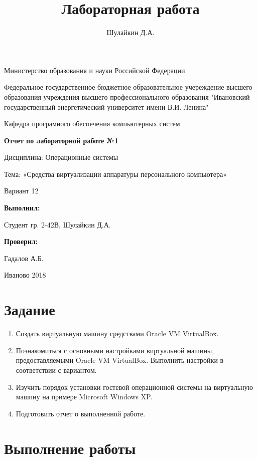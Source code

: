 \documentclass[a4paper]{article}
\title{Лабораторная работа}
\author{Шулайкин Д.А.}
\begin{document}
\onehalfspacing
\thispagestyle{empty}
\begin{center}
Министерство образования и науки Российской Федерации
\vspace{10pt}

Федеральное государственное бюджетное образовательное учереждение высшего образования учреждения высшего профессионального образования "Ивановский государственный энергетический университет имени В.И. Ленина"
\vspace{40pt}

Кафедра програмного обеспечения компьютерных систем
\vspace{40pt}

\textbf{Отчет по лабораторной работе №1}

Дисциплина: Операционные системы

Тема: «Средства виртуализации аппаратуры персонального компьютера»

Вариант 12
\end{center}

\vspace{330pt}
\begin{flushright}
\textbf{Выполнил:}

Студент гр. 2-42В, Шулайкин Д.А.

\textbf{Проверил:}

Гадалов А.Б.
\end{flushright}
\vspace{40pt}
\begin{center}
Иваново 2018
\end{center}
\pagebreak

\section{Задание}
\begin{enumerate}
\item Создать виртуальную машину средствами Oracle VM VirtualBox.
\item Познакомиться с основными настройками виртуальной машины, предоставляемыми Oracle VM VirtualBox. Выполнить настройки в соответствии с вариантом.
\item Изучить порядок установки гостевой операционной системы на виртуальную машину на примере Microsoft Windows XP.
\item Подготовить отчет о выполненной работе.
\end{enumerate}
\section{Выполнение работы}
\end{document}
